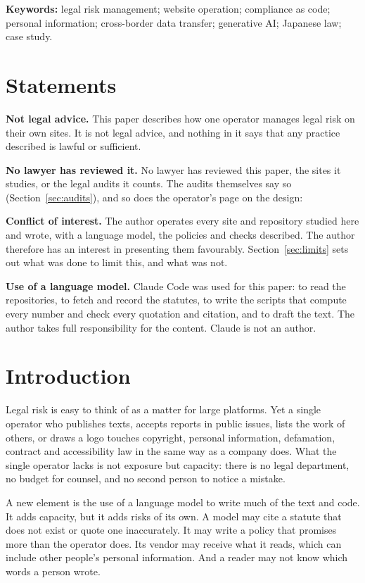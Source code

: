 \documentclass[11pt]{article}
\newcommand{\srcq}[1]{\directlua{srcq("\luaescapestring{#1}")}}
\begin{document}
\medskip
\noindent\textbf{Keywords:} legal risk management; website operation; compliance as code; personal information; cross-border data transfer; generative AI; Japanese law; case study.


\section*{Statements}
\noindent\textbf{Not legal advice.} This paper describes how one operator manages legal risk on their own sites. It is not legal advice, and nothing in it says that any practice described is lawful or sufficient.

\noindent\textbf{No lawyer has reviewed it.} No lawyer has reviewed this paper, the sites it studies, or the legal audits it counts. The audits themselves say so (Section~\ref{sec:audits}), and so does the operator's page on the design: \srcq{dl-no-lawyer}

\noindent\textbf{Conflict of interest.} The author operates every site and repository studied here and wrote, with a language model, the policies and checks described. The author therefore has an interest in presenting them favourably. Section~\ref{sec:limits} sets out what was done to limit this, and what was not.

\noindent\textbf{Use of a language model.} Claude Code was used for this paper: to read the repositories, to fetch and record the statutes, to write the scripts that compute every number and check every quotation and citation, and to draft the text. The author takes full responsibility for the content. Claude is not an author.

\section{Introduction}\label{sec:intro}

Legal risk is easy to think of as a matter for large platforms. Yet a single operator who publishes texts, accepts reports in public issues, lists the work of others, or draws a logo touches copyright, personal information, defamation, contract and accessibility law in the same way as a company does. What the single operator lacks is not exposure but capacity: there is no legal department, no budget for counsel, and no second person to notice a mistake.

A new element is the use of a language model to write much of the text and code. It adds capacity, but it adds risks of its own. A model may cite a statute that does not exist or quote one inaccurately. It may write a policy that promises more than the operator does. Its vendor may receive what it reads, which can include other people's personal information. And a reader may not know which words a person wrote.
\end{document}
